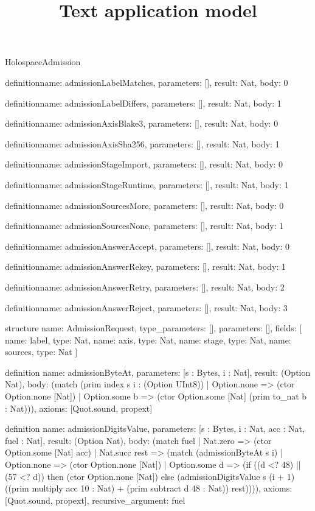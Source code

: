 \begin{lexlean}{HolospaceAdmission}
\title{Text application model}
\begin{semanticmodule}
definition{name: admissionLabelMatches, parameters: [], result: Nat, body: 0}

definition{name: admissionLabelDiffers, parameters: [], result: Nat, body: 1}

definition{name: admissionAxisBlake3, parameters: [], result: Nat, body: 0}

definition{name: admissionAxisSha256, parameters: [], result: Nat, body: 1}

definition{name: admissionStageImport, parameters: [], result: Nat, body: 0}

definition{name: admissionStageRuntime, parameters: [], result: Nat, body: 1}

definition{name: admissionSourcesMore, parameters: [], result: Nat, body: 0}

definition{name: admissionSourcesNone, parameters: [], result: Nat, body: 1}

definition{name: admissionAnswerAccept, parameters: [], result: Nat, body: 0}

definition{name: admissionAnswerRekey, parameters: [], result: Nat, body: 1}

definition{name: admissionAnswerRetry, parameters: [], result: Nat, body: 2}

definition{name: admissionAnswerReject, parameters: [], result: Nat, body: 3}

structure{
  name: AdmissionRequest,
  type_parameters: [],
  parameters: [],
  fields: [
    {name: label, type: Nat},
    {name: axis, type: Nat},
    {name: stage, type: Nat},
    {name: sources, type: Nat}
  ]
}

definition{
  name: admissionByteAt,
  parameters: [s : Bytes, i : Nat],
  result: (Option Nat),
  body: (match (prim index s i : (Option UInt8))
    | Option.none => (ctor Option.none [Nat])
    | Option.some b => (ctor Option.some [Nat] (prim to_nat b : Nat))),
  axioms: [Quot.sound, propext]
}

definition{
  name: admissionDigitsValue,
  parameters: [s : Bytes, i : Nat, acc : Nat, fuel : Nat],
  result: (Option Nat),
  body: (match fuel
    | Nat.zero => (ctor Option.some [Nat] acc)
    | Nat.succ rest => (match (admissionByteAt s i)
      | Option.none => (ctor Option.none [Nat])
      | Option.some d => (if ((d <? 48) || (57 <? d)) then (ctor Option.none [Nat]) else (admissionDigitsValue s (i + 1) ((prim multiply acc 10 : Nat) + (prim subtract d 48 : Nat)) rest)))),
  axioms: [Quot.sound, propext],
  recursive_argument: fuel
}


\end{semanticmodule}
\end{lexlean}
